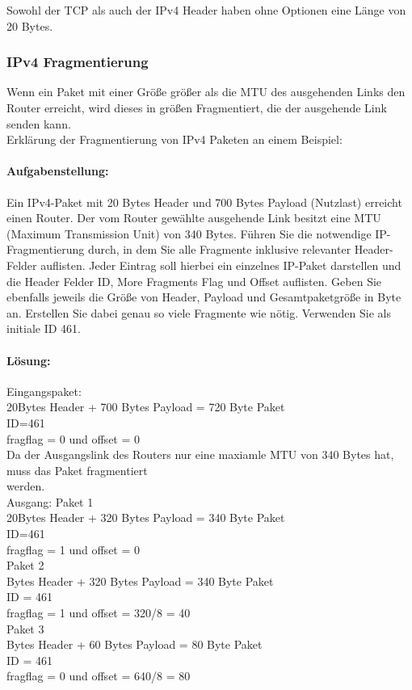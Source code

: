 Sowohl der TCP als auch der IPv4 Header haben ohne Optionen eine Länge von 20 Bytes.

\subsubsection{IPv4 Fragmentierung}
Wenn ein Paket mit einer Größe größer als die MTU des ausgehenden Links den Router erreicht, wird dieses in größen Fragmentiert, die der ausgehende Link senden kann.\\
Erklärung der Fragmentierung von IPv4 Paketen an einem Beispiel:
\hfill\break 
\paragraph{Aufgabenstellung:}Ein IPv4-Paket mit 20 Bytes Header und 700 Bytes Payload (Nutzlast) erreicht einen Router.
Der vom Router gewählte ausgehende Link besitzt eine MTU (Maximum Transmission Unit) von 340 Bytes.
Führen Sie die notwendige IP-Fragmentierung durch, in dem Sie alle Fragmente inklusive relevanter Header-Felder auflisten.
Jeder Eintrag soll hierbei ein einzelnes IP-Paket darstellen und die Header Felder ID, More Fragments Flag und Offset auflisten.
Geben Sie ebenfalls jeweils die Größe von Header, Payload und Gesamtpaketgröße in Byte an.
Erstellen Sie dabei genau so viele Fragmente wie nötig. Verwenden Sie als initiale ID 461.\\

\paragraph{Lösung:}
Eingangspaket:\\

\noindent20Bytes Header + 700 Bytes Payload = 720 Byte Paket\\
ID=461\\
fragflag = 0 und offset = 0\\
Da der Ausgangslink des Routers nur eine maxiamle MTU von 340 Bytes hat, muss das Paket fragmentiert\\ werden.\\
\hfill \break
Ausgang: Paket 1\\
\noindent20Bytes Header + 320 Bytes Payload = 340 Byte Paket\\
ID=461\\
fragflag = 1 und offset = 0\\
\hfill \break
Paket 2\\
 Bytes Header + 320 Bytes Payload = 340 Byte Paket\\
ID = 461\\
fragflag = 1 und offset = 320/8 = 40\\
\hfill \break
Paket 3\\
 Bytes Header + 60 Bytes Payload = 80 Byte Paket\\
ID = 461\\
fragflag = 0 und offset = 640/8 = 80\\

